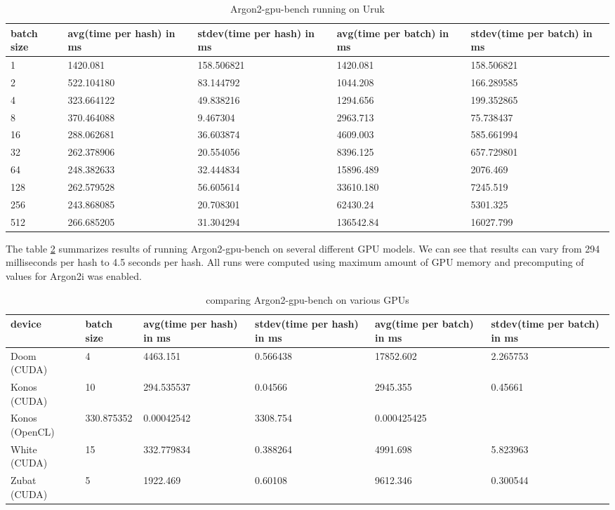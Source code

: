 \documentclass[nolof]{fithesis3}
\begin{document}
\noindent
\begin{table}
\caption{Argon2-gpu-bench running on Uruk}
\label{tab:uruk}
\begin{tabularx}{\textwidth}{| X | X | X | X | X |}
\hline
batch size & avg(time per hash) in ms & stdev(time per hash) in ms & avg(time per batch) in ms & stdev(time per batch) in ms\\
\hline
1 & 1420.081 & 158.506821 & 1420.081 & 158.506821\\
\hline
2 & 522.104180 & 83.144792 & 1044.208 & 166.289585\\
\hline
4 & 323.664122 & 49.838216 & 1294.656 & 199.352865\\
\hline
8 & 370.464088 & 9.467304 & 2963.713 & 75.738437\\
\hline
16 & 288.062681 & 36.603874 & 4609.003 & 585.661994\\
\hline
32 & 262.378906 & 20.554056 & 8396.125 & 657.729801\\
\hline
64 & 248.382633 & 32.444834 & 15896.489 & 2076.469\\
\hline
128 & 262.579528 & 56.605614 & 33610.180 & 7245.519\\
\hline
256 & 243.868085 & 20.708301 & 62430.24 & 5301.325\\
\hline
512 & 266.685205 & 31.304294 & 136542.84 & 16027.799\\
\hline
\end{tabularx}
\end{table}

The table \ref{tab:gpus} summarizes results of running Argon2-gpu-bench on several different GPU models. We can see that results can vary from 294 milliseconds per hash to 4.5 seconds per hash. All runs were computed using maximum amount of GPU memory and precomputing of values for Argon2i was enabled.

\noindent
\begin{table}
\caption{comparing Argon2-gpu-bench on various GPUs}
\label{tab:gpus}
\begin{tabularx}{\textwidth}{| X | X | X | X | X | X |}
\hline
device & batch size & avg(time per hash) in ms & stdev(time per hash) in ms & avg(time per batch) in ms & stdev(time per batch) in ms\\
\hline
Doom (CUDA) & 4 & 4463.151 & 0.566438 & 17852.602 & 2.265753\\
\hline
Konos (CUDA) & 10 & 294.535537 & 0.04566 & 2945.355 & 0.45661 \\
\hline
Konos (OpenCL) & 330.875352 & 0.00042542 & 3308.754 & 0.000425425\\ 
\hline
White  (CUDA) & 15 & 332.779834 & 0.388264 & 4991.698 & 5.823963\\
\hline
Zubat (CUDA) & 5 & 1922.469 & 0.60108 & 9612.346 &0.300544\\
\hline
\end{tabularx}
\end{table}
\end{document}
